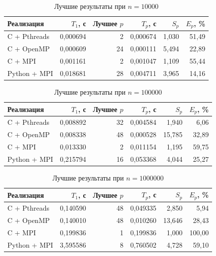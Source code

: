 \begin{table}[H]\centering\small
\caption{Лучшие результаты при $n=10000$}\label{tab:best10000}
\begin{tabular}{lrrrrr}\toprule
Реализация & $T_1$, с & Лучшее $p$ & $T_p$, с & $S_p$ & $E_p$, \%\\\midrule
C + Pthreads & 0,000694 & 2 & 0,000674 & 1,030 & 51,49\\
C + OpenMP & 0,000609 & 24 & 0,000111 & 5,494 & 22,89\\
C + MPI & 0,001161 & 2 & 0,001047 & 1,109 & 55,44\\
Python + MPI & 0,018681 & 28 & 0,004711 & 3,965 & 14,16\\
\bottomrule\end{tabular}
\end{table}

\begin{table}[H]\centering\small
\caption{Лучшие результаты при $n=100000$}\label{tab:best100000}
\begin{tabular}{lrrrrr}\toprule
Реализация & $T_1$, с & Лучшее $p$ & $T_p$, с & $S_p$ & $E_p$, \%\\\midrule
C + Pthreads & 0,008892 & 32 & 0,004584 & 1,940 & 6,06\\
C + OpenMP & 0,008338 & 48 & 0,000528 & 15,785 & 32,89\\
C + MPI & 0,013330 & 2 & 0,011154 & 1,195 & 59,75\\
Python + MPI & 0,215794 & 16 & 0,053368 & 4,044 & 25,27\\
\bottomrule\end{tabular}
\end{table}

\begin{table}[H]\centering\small
\caption{Лучшие результаты при $n=1000000$}\label{tab:best1000000}
\begin{tabular}{lrrrrr}\toprule
Реализация & $T_1$, с & Лучшее $p$ & $T_p$, с & $S_p$ & $E_p$, \%\\\midrule
C + Pthreads & 0,140590 & 48 & 0,049335 & 2,850 & 5,94\\
C + OpenMP & 0,140010 & 48 & 0,010260 & 13,646 & 28,43\\
C + MPI & 0,199836 & 1 & 0,199836 & 1,000 & 100,00\\
Python + MPI & 3,595586 & 8 & 0,760502 & 4,728 & 59,10\\
\bottomrule\end{tabular}
\end{table}